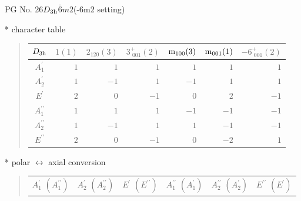\documentclass[fleqn,8pt,landscape]{jsarticle}
\begin{document}
\setcounter{MaxMatrixCols}{32}

\renewcommand{\tablename}{Table~}
\renewcommand{\figurename}{Figure~}
\begin{center}
\LARGE
PG No. 26\quad$D_{\rm 3h}$\quad$\bar{6}m2$\quad(-6m2 setting)\quad[ hexagonal ]
\end{center}

* character table
\begin{quote}
\begin{tabular}{crrrrrr} \hline \hline
$ D_{\rm 3h} $ & $ 1(1) $ & $ 2{}_{120}(3) $ & $ 3^{+}_{\,\,001}(2) $ & $ {\rm m}_{100}(3) $ & $ {\rm m}_{001}(1) $ & $ -6^{+}_{\,\,001}(2) $ \\ \hline
$ A_{1}^{\prime} $ & $ 1 $ & $ 1 $ & $ 1 $ & $ 1 $ & $ 1 $ & $ 1 $ \\
$ A_{2}^{\prime} $ & $ 1 $ & $ -1 $ & $ 1 $ & $ -1 $ & $ 1 $ & $ 1 $ \\
$ E^{\prime} $ & $ 2 $ & $ 0 $ & $ -1 $ & $ 0 $ & $ 2 $ & $ -1 $ \\
$ A_{1}^{\prime\prime} $ & $ 1 $ & $ 1 $ & $ 1 $ & $ -1 $ & $ -1 $ & $ -1 $ \\
$ A_{2}^{\prime\prime} $ & $ 1 $ & $ -1 $ & $ 1 $ & $ 1 $ & $ -1 $ & $ -1 $ \\
$ E^{\prime\prime} $ & $ 2 $ & $ 0 $ & $ -1 $ & $ 0 $ & $ -2 $ & $ 1 $ \\
 \hline \hline
\end{tabular}
\end{quote}

* polar $\leftrightarrow$ axial conversion
\begin{quote}
\begin{tabular}{cccccc}
$ A_{1}^{\prime}\,\,(A_{1}^{\prime\prime}) $ & $ A_{2}^{\prime}\,\,(A_{2}^{\prime\prime}) $ & $ E^{\prime}\,\,(E^{\prime\prime}) $ & $ A_{1}^{\prime\prime}\,\,(A_{1}^{\prime}) $ & $ A_{2}^{\prime\prime}\,\,(A_{2}^{\prime}) $ & $ E^{\prime\prime}\,\,(E^{\prime}) $
\end{tabular}
\end{quote}
\end{document}
